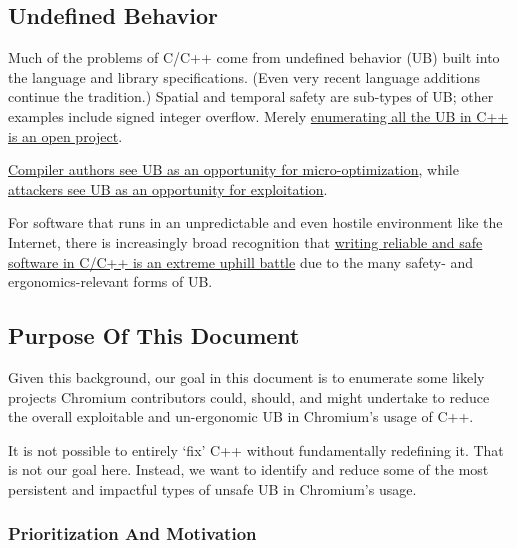 \documentclass[a4paper,12pt,notitlepage,twoside,openright]{article}
\begin{document}
\subsection{Undefined Behavior}

Much of the problems of C/C++ come from undefined behavior (UB) built
into the language and library specifications. (Even very recent language
additions continue the tradition.) Spatial and temporal safety are
sub-types of UB; other examples include signed integer overflow.
Merely \href{https://www.google.com/url?q=http://www.open-std.org/jtc1/sc22/wg21/docs/papers/2019/p1705r1.html\&sa=D\&source=editors\&ust=1631944129024000\&usg=AOvVaw105cmRp9-saBo3luPsWpiN}{enumerating
all the UB in C++ is an open project}.

\href{https://www.google.com/url?q=https://blog.regehr.org/archives/213\&sa=D\&source=editors\&ust=1631944129024000\&usg=AOvVaw1I5eRSTln2KNNjipgz2Opq}{Compiler
authors see UB as an opportunity for micro-optimization},
while \href{https://www.google.com/url?q=http://www.dullien.net/thomas/weird-machines-exploitability.pdf\&sa=D\&source=editors\&ust=1631944129025000\&usg=AOvVaw0BM_xMKnu3TtvqeuuCOiBX}{attackers
see UB as an opportunity for exploitation}.

For software that runs in an unpredictable and even hostile environment
like the Internet, there is increasingly broad recognition
that \href{https://www.google.com/url?q=https://alexgaynor.net/2020/may/27/science-on-memory-unsafety-and-security/\&sa=D\&source=editors\&ust=1631944129025000\&usg=AOvVaw2BcG3fkxkIPmIk7JDpUpR9}{writing
reliable and safe software in C/C++ is an extreme uphill battle} due to
the many safety- and ergonomics-relevant forms of UB.

\subsection{Purpose Of This Document}

Given this background, our goal in this document is to enumerate some
likely projects Chromium contributors could, should, and might undertake
to reduce the overall exploitable and un-ergonomic UB in Chromium's
usage of C++.

It is not possible to entirely `fix' C++ without fundamentally
redefining it. That is not our goal here. Instead, we want to identify
and reduce some of the most persistent and impactful types of unsafe UB
in Chromium's usage.

\subsubsection{Prioritization And Motivation}
\end{document}
